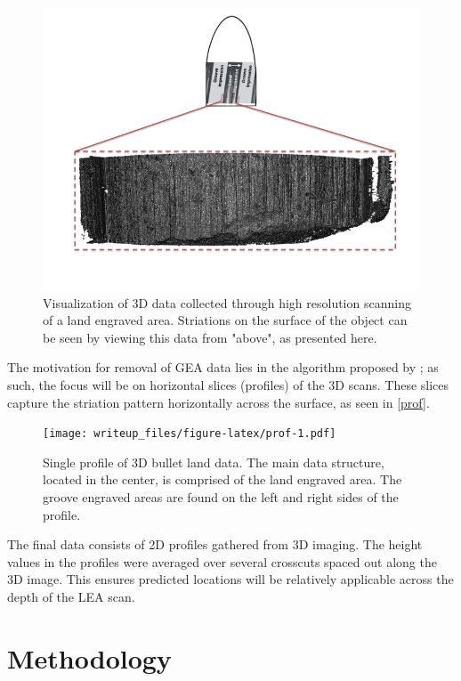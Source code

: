 \documentclass[]{article}
\begin{document}
\begin{figure}
\includegraphics[width=\textwidth]{./images/3d_plot_top_context_breakoff} \caption{\label{LEA}Visualization of 3D data collected through high resolution scanning of a land engraved area. Striations on the surface of the object can be seen by viewing this data from "above", as presented here.}\label{fig:LEA}
\end{figure}

The motivation for removal of GEA data lies in the algorithm proposed by
\citet{Hare1}; as such, the focus will be on horizontal slices
(profiles) of the 3D scans. These slices capture the striation pattern
horizontally across the surface, as seen in \autoref{prof}.

\begin{figure}
\centering
\texttt{[image: writeup\_files/figure-latex/prof-1.pdf]}
\caption{\label{prof}Single profile of 3D bullet land data. The main
data structure, located in the center, is comprised of the land engraved
area. The groove engraved areas are found on the left and right sides of
the profile.}
\end{figure}

The final data consists of 2D profiles gathered from 3D imaging. The
height values in the profiles were averaged over several crosscuts
spaced out along the 3D image. This ensures predicted locations will be
relatively applicable across the depth of the LEA scan.

\section{Methodology}
\end{document}
